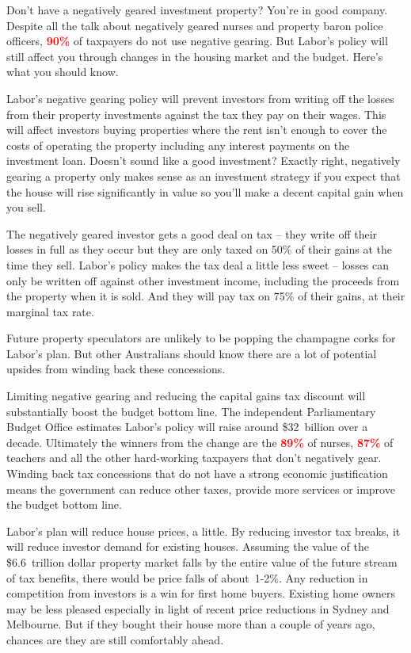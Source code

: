 \documentclass[b5paper,11pt]{article}\usepackage[]{graphicx}\usepackage[]{color}
\begin{document}
Don't have a negatively geared investment property? You're in good
company. Despite all the talk about negatively geared nurses and
property baron police officers, \textcolor{red}{\textbf{90\%}} of taxpayers do not use negative
gearing. But Labor's policy will still affect you through changes in the
housing market and the budget. Here's what you should know.

Labor's negative gearing policy will prevent investors from writing off
the losses from their property investments against the tax they pay on
their wages. This will affect investors buying properties where the rent
isn't enough to cover the costs of operating the property including any
interest payments on the investment loan. Doesn't sound like a good
investment? Exactly right, negatively gearing a property only makes
sense as an investment strategy if you expect that the house will rise
significantly in value so you'll make a decent capital gain when you
sell.

The negatively geared investor gets a good deal on tax -- they write off
their losses in full as they occur but they are only taxed on 50\%
of their gains at the time they sell. Labor's policy makes the tax
deal a little less sweet -- losses can only be written off against other
investment income, including the proceeds from the property when it is
sold. And they will pay tax on 75\% of their gains, at their
marginal tax rate.

Future property speculators are unlikely to be popping the champagne
corks for Labor's plan. But other Australians should know there are a
lot of potential upsides from winding back these concessions.

Limiting negative gearing and reducing the capital gains tax discount
will substantially boost the budget bottom line. The independent
Parliamentary Budget Office estimates Labor's policy will raise around
\$32~billion over a decade. Ultimately the winners from the change are
the \textcolor{red}{\textbf{89\%}} of nurses, \textcolor{red}{\textbf{87\%}} of teachers and all the other
hard-working taxpayers that don't negatively gear. Winding back tax
concessions that do not have a strong economic justification means the
government can reduce other taxes, provide more services or improve the
budget bottom line.

Labor's plan will reduce house prices, a little. By reducing investor
tax breaks, it will reduce investor demand for existing houses. Assuming
the value of the \$6.6~trillion dollar property market falls by the
entire value of the future stream of tax benefits, there would be price
falls of about~1-2\%. Any reduction in competition from
investors is a win for first home buyers. Existing home owners may be
less pleased especially in light of recent price reductions in Sydney
and Melbourne. But if they bought their house more than a couple of
years ago, chances are they are still comfortably ahead.
\end{document}

